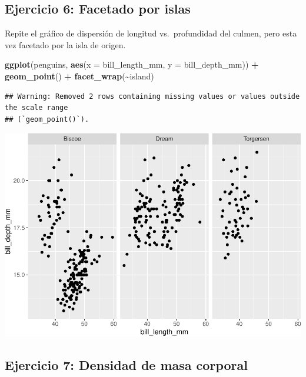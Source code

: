 \documentclass[
]{book}
\newenvironment{Shaded}{\begin{snugshade}}{\end{snugshade}}
\newcommand{\AttributeTok}[1]{\textcolor[rgb]{0.13,0.29,0.53}{#1}}
\newcommand{\FunctionTok}[1]{\textcolor[rgb]{0.13,0.29,0.53}{\textbf{#1}}}
\newcommand{\NormalTok}[1]{#1}
\newcommand{\SpecialCharTok}[1]{\textcolor[rgb]{0.81,0.36,0.00}{\textbf{#1}}}
\begin{document}
\hypertarget{ejercicio-6-facetado-por-islas-1}{%
\subsection{Ejercicio 6: Facetado por islas}\label{ejercicio-6-facetado-por-islas-1}}

Repite el gráfico de dispersión de longitud vs.~profundidad del culmen, pero esta vez facetado por la isla de origen.

\begin{Shaded}
\begin{Highlighting}[]
\FunctionTok{ggplot}\NormalTok{(penguins, }\FunctionTok{aes}\NormalTok{(}\AttributeTok{x =}\NormalTok{ bill\_length\_mm, }\AttributeTok{y =}\NormalTok{ bill\_depth\_mm)) }\SpecialCharTok{+}
  \FunctionTok{geom\_point}\NormalTok{() }\SpecialCharTok{+}
  \FunctionTok{facet\_wrap}\NormalTok{(}\SpecialCharTok{\textasciitilde{}}\NormalTok{island)}
\end{Highlighting}
\end{Shaded}

\begin{verbatim}
## Warning: Removed 2 rows containing missing values or values outside the scale range
## (`geom_point()`).
\end{verbatim}

\includegraphics{bookdown-demo_files/figure-latex/unnamed-chunk-205-1.pdf}

\hypertarget{ejercicio-7-densidad-de-masa-corporal-1}{%
\subsection{Ejercicio 7: Densidad de masa corporal}\label{ejercicio-7-densidad-de-masa-corporal-1}}
\end{document}
